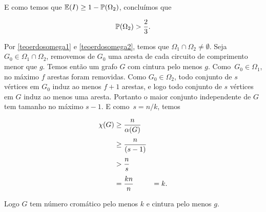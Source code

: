 E como temos que $\mathbb{E}(I) \geq 1 - \mathbb{P}(\Omega_2)$, concluímos que

\begin{equation}\label{teoerdosomega2}
\mathbb{P}(\Omega_2) > \frac{2}{3}.
\end{equation}

Por \ref{teoerdosomega1} e \ref{teoerdosomega2}, temos que $\Omega_1 \cap \Omega_2 \neq \emptyset$. Seja $G_0 \in \Omega_1 \cap \Omega_2$, removemos de $G_0$ uma aresta de cada circuito de comprimento menor que $g$. Temos então um grafo $G$ com cintura pelo menos $g$. Como~$G_0 \in \Omega_1$, no máximo $f$ arestas foram removidas. Como $G_0 \in \Omega_2$, todo conjunto de $s$ vértices em $G_0$ induz ao menos $f+1$ arestas, e logo todo conjunto de $s$ vértices em $G$ induz ao menos uma aresta. Portanto o maior conjunto independente de $G$ tem tamanho no máximo $s-1$. E como~$s = n/k$, temos

\begin{equation*}
\setlength{\jot}{6pt}
\begin{aligned}
\chi(G) &\geq \frac{n}{\alpha(G)} \\
&\geq \frac{n}{(s-1)} \\
&> \frac{n}{s}\\
&= \frac{kn}{n} & = k.
\end{aligned}
\end{equation*}

Logo $G$ tem número cromático pelo menos $k$ e cintura pelo menos $g$.







